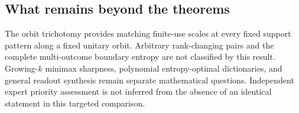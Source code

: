 \subsection{What remains beyond the theorems}
The orbit trichotomy provides matching finite-use scales at every
fixed support pattern along a fixed unitary orbit.  Arbitrary
rank-changing pairs and the complete multi-outcome boundary entropy
are not classified by this result.  Growing-$k$ minimax sharpness,
polynomial entropy-optimal dictionaries, and general readout synthesis
remain separate mathematical questions.  Independent expert priority
assessment is not inferred from the absence of an identical statement
in this targeted comparison.

